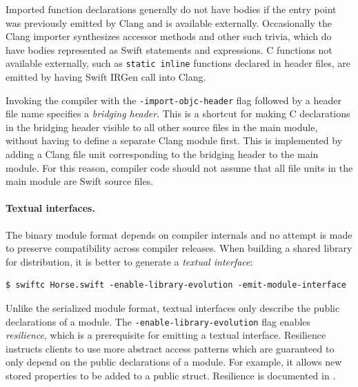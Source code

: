 \documentclass[../generics]{subfiles}
\begin{document}
Imported function declarations generally do not have bodies if the entry point was previously emitted by Clang and is available externally. Occasionally the Clang importer synthesizes accessor methods and other such trivia, which do have bodies represented as Swift statements and expressions. C functions not available externally, such as \texttt{static inline} functions declared in header files, are emitted by having Swift IRGen call into Clang.

Invoking the compiler with the \texttt{-import-objc-header} flag followed by a header file name specifies a \emph{bridging header}. This is a shortcut for making C declarations in the bridging header visible to all other source files in the main module, without having to define a separate Clang module first. This is implemented by adding a Clang file unit corresponding to the bridging header to the main module. For this reason, compiler code should not assume that all file units in the main module are Swift source files.

\paragraph{Textual interfaces.} The binary module format depends on compiler internals and no attempt is made to preserve compatibility across compiler releases. When building a shared library for distribution, it is better to generate a \emph{textual interface}:
\begin{Verbatim}
$ swiftc Horse.swift -enable-library-evolution -emit-module-interface
\end{Verbatim}
Unlike the serialized module format, textual interfaces only describe the public declarations of a module. The \texttt{-enable-library-evolution} flag enables \emph{resilience}, which is a prerequisite for emitting a textual interface. Resilience instructs clients to use more abstract access patterns which are guaranteed to only depend on the public declarations of a module. For example, it allows new stored properties to be added to a public struct. Resilience is documented in \cite{evolutionblog,libraryevolution}.
\end{document}
